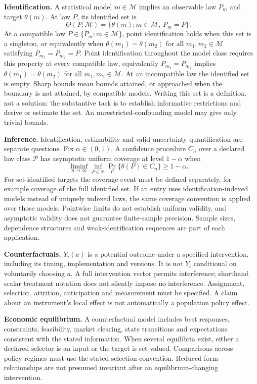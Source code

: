 \documentclass[11pt,a4paper]{article}
\begin{document}
\textbf{Identification.} A statistical model $m\in\mathcal M$ implies an observable law $P_m$ and target $\theta(m)$. At law $P$, its identified set is
\[
\Theta(P;\mathcal M)=\{\theta(m):m\in\mathcal M,\ P_m=P\}.
\]
At a compatible law $P\in\{P_m:m\in\mathcal M\}$, point identification holds when this set is a singleton, or equivalently when $\theta(m_1)=\theta(m_2)$ for all $m_1,m_2\in\mathcal M$ satisfying $P_{m_1}=P_{m_2}=P$. Point identification throughout the model class requires this property at every compatible law, equivalently $P_{m_1}=P_{m_2}$ implies $\theta(m_1)=\theta(m_2)$ for all $m_1,m_2\in\mathcal M$. At an incompatible law the identified set is empty. Sharp bounds mean bounds attained, or approached when the boundary is not attained, by compatible models. Writing this set is a definition, not a solution: the substantive task is to establish informative restrictions and derive or estimate the set. An unrestricted-confounding model may give only trivial bounds.

\textbf{Inference.} Identification, estimability and valid uncertainty quantification are separate questions. Fix $\alpha\in(0,1)$. A confidence procedure $C_n$ over a declared law class $\mathcal P$ has asymptotic uniform coverage at level $1-\alpha$ when
\[
\liminf_{n\to\infty}\inf_{P\in\mathcal P}\Pr_P\{\theta(P)\in C_n\}\geq1-\alpha.
\]
For set-identified targets the coverage event must be defined separately, for example coverage of the full identified set. If an entry uses identification-indexed models instead of uniquely indexed laws, the same coverage convention is applied over those models. Pointwise limits do not establish uniform validity, and asymptotic validity does not guarantee finite-sample precision. Sample sizes, dependence structures and weak-identification sequences are part of each application.

\textbf{Counterfactuals.} $Y_i(a)$ is a potential outcome under a specified intervention, including its timing, implementation and versions. It is not $Y_i$ conditional on voluntarily choosing $a$. A full intervention vector permits interference; shorthand scalar treatment notation does not silently impose no interference. Assignment, selection, attrition, anticipation and measurement must be specified. A claim about an instrument's local effect is not automatically a population policy effect.

\textbf{Economic equilibrium.} A counterfactual model includes best responses, constraints, feasibility, market clearing, state transitions and expectations consistent with the stated information. When several equilibria exist, either a declared selector is an input or the target is set-valued. Comparisons across policy regimes must use the stated selection convention. Reduced-form relationships are not presumed invariant after an equilibrium-changing intervention.
\end{document}

